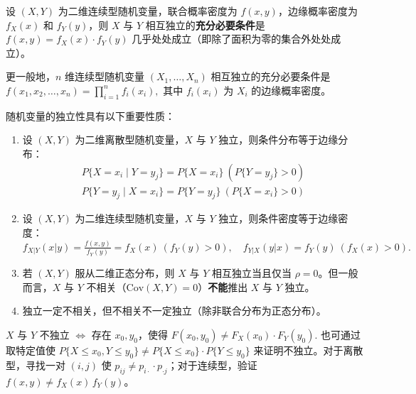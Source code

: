 \documentclass[lang=cn,11pt]{elegantbook}
\begin{document}
\begin{theorem}[连续型随机变量独立的判定]\label{thm:continuous-independence}
设 $(X,Y)$ 为二维连续型随机变量，联合概率密度为 $f(x,y)$，边缘概率密度为 $f_X(x)$ 和 $f_Y(y)$，则 $X$ 与 $Y$ 相互独立的\textbf{充分必要条件}是
\(
f(x,y) = f_X(x) \cdot f_Y(y)
\)
几乎处处成立（即除了面积为零的集合外处处成立）。

更一般地，$n$ 维连续型随机变量 $(X_1, \dots, X_n)$ 相互独立的充分必要条件是
\(
f(x_1, x_2, \dots, x_n) = \prod_{i=1}^{n}f_i(x_i),
\)
其中 $f_i(x_i)$ 为 $X_i$ 的边缘概率密度。
\end{theorem}

\begin{property}\label{prop:independence-implications}
随机变量的独立性具有以下重要性质：
\begin{enumerate}
    \item 设 $(X,Y)$ 为二维离散型随机变量，$X$ 与 $Y$ 独立，则条件分布等于边缘分布：
    \begin{align*}
    P\{X = x_i \mid Y = y_j\} = P\{X = x_i\}\ (P\{Y = y_j\} > 0)\\
     P\{Y = y_j \mid X = x_i\} = P\{Y = y_j\}\ (P\{X = x_i\} > 0)
    \end{align*}
    \item 设 $(X,Y)$ 为二维连续型随机变量，$X$ 与 $Y$ 独立，则条件密度等于边缘密度：
    \(
    f_{X|Y}(x|y) = \frac{f(x,y)}{f_Y(y)} = f_X(x)\ (f_Y(y) > 0), \quad f_{Y|X}(y|x) = f_Y(y)\ (f_X(x) > 0).
    \)
    \item 若 $(X,Y)$ 服从二维正态分布，则 $X$ 与 $Y$ 相互独立当且仅当 $\rho = 0$。但一般而言，$X$ 与 $Y$ 不相关（$\mathrm{Cov}(X,Y) = 0$）\textbf{不能}推出 $X$ 与 $Y$ 独立。
    \item 独立一定不相关，但不相关不一定独立（除非联合分布为正态分布）。
\end{enumerate}
\end{property}

\begin{property}[不独立的判定]\label{prop:dependence-criterion}
$X$ 与 $Y$ 不独立 $\iff$ 存在 $x_0, y_0$，使得
\(
F(x_0, y_0) \neq F_X(x_0) \cdot F_Y(y_0).
\)
也可通过取特定值使 $P\{X \leqslant x_0, Y \leqslant y_0\} \neq P\{X \leqslant x_0\} \cdot P\{Y \leqslant y_0\}$ 来证明不独立。对于离散型，寻找一对 $(i,j)$ 使 $p_{ij} \neq p_{i\cdot} \cdot p_{\cdot j}$；对于连续型，验证 $f(x,y) \neq f_X(x)\,f_Y(y)$。
\end{property}
\end{document}
